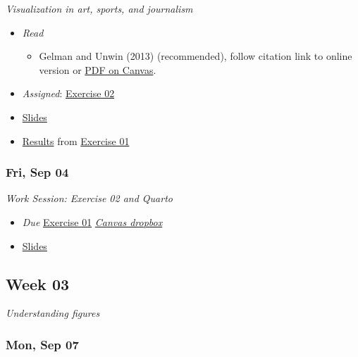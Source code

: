 \documentclass[
  letterpaper,
  DIV=11,
  numbers=noendperiod]{scrartcl}
\providecommand{\tightlist}{%
  \setlength{\itemsep}{0pt}\setlength{\parskip}{0pt}}
\begin{document}
\emph{Visualization in art, sports, and journalism}

\begin{itemize}
\tightlist
\item
  \emph{Read}

  \begin{itemize}
  \tightlist
  \item
    Gelman and Unwin (2013) (recommended), follow citation link to
    online version or
    \href{https://psu.instructure.com/courses/2484925/files?preview=193922116}{PDF
    on Canvas}.
  \end{itemize}
\item
  {\emph{Assigned}}:
  \href{exercises/ex-02-data-viz-outside-psych.qmd}{Exercise 02}
\item
  \href{slides/slides/wk-02-2026-09-02-art-sports-journ.qmd}{Slides}
\item
  \href{404.qmd}{Results} from
  \href{exercises/ex-01-figs-in-psych-sci.qmd}{Exercise 01}
\end{itemize}

\subsubsection*{Fri, Sep 04}\label{fri-sep-04}

\emph{Work Session: Exercise 02 and Quarto}

\begin{itemize}
\tightlist
\item
   \emph{Due}
  \href{exercises/ex-01-figs-in-psych-sci.qmd}{Exercise 01} \textbar{}
  \href{https://psu.instructure.com/courses/2484925/assignments/18448425}{
  \emph{Canvas dropbox}}
\item
  \href{404.qmd}{Slides}
\end{itemize}

\subsection*{Week 03}\label{week-03}

\emph{Understanding figures}

\subsubsection*{Mon, Sep 07}\label{mon-sep-07}
\end{document}
